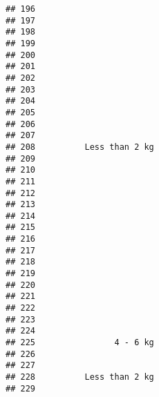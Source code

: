 \documentclass[
]{article}
\begin{document}
\begin{verbatim}
## 196                                                                       
## 197                                                                       
## 198                                                                       
## 199                                                                       
## 200                                                                       
## 201                                                                       
## 202                                                                       
## 203                                                                       
## 204                                                                       
## 205                                                                       
## 206                                                                       
## 207                                                                       
## 208          Less than 2 kg                                               
## 209                                                                       
## 210                                                                       
## 211                                                                       
## 212                                                                       
## 213                                                                       
## 214                                                                       
## 215                                                                       
## 216                                                                       
## 217                                                                       
## 218                                                                       
## 219                                                                       
## 220                                                                       
## 221                                                                       
## 222                                                                       
## 223                                                                       
## 224                                                                       
## 225                4 - 6 kg                                               
## 226                                                                       
## 227                                                                       
## 228          Less than 2 kg                                               
## 229                                                                       

\end{verbatim}
\end{document}
